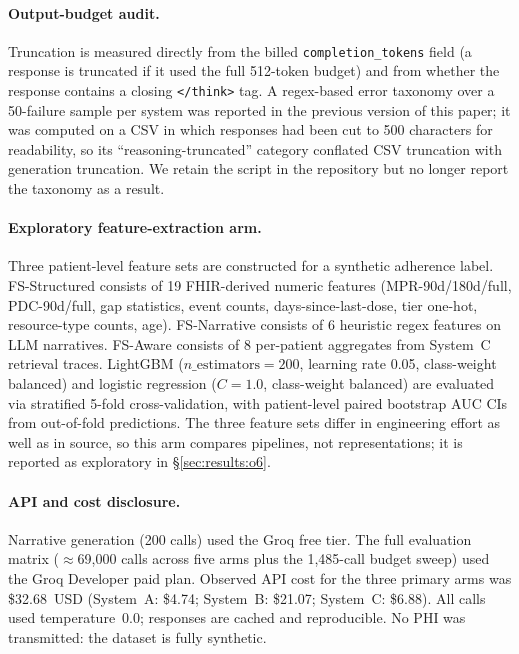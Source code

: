 \paragraph{Output-budget audit.}
Truncation is measured directly from the billed \texttt{completion\_tokens} field
(a response is truncated if it used the full 512-token budget) and from whether the
response contains a closing \texttt{</think>} tag.  A regex-based error taxonomy over a
50-failure sample per system was reported in the previous version of this paper; it was
computed on a CSV in which responses had been cut to 500 characters for readability, so
its ``reasoning-truncated'' category conflated CSV truncation with generation truncation.
We retain the script in the repository but no longer report the taxonomy as a result.

\paragraph{Exploratory feature-extraction arm.}
Three patient-level feature sets are constructed for a synthetic adherence label.
FS-Structured consists of 19 FHIR-derived numeric features (MPR-90d/180d/full,
PDC-90d/full, gap statistics, event counts, days-since-last-dose, tier one-hot,
resource-type counts, age).  FS-Narrative consists of 6 heuristic regex features on LLM
narratives.  FS-Aware consists of 8 per-patient aggregates from System~C retrieval traces.
LightGBM ($n\_\text{estimators}=200$, learning rate 0.05, class-weight balanced) and
logistic regression ($C=1.0$, class-weight balanced) are evaluated via stratified 5-fold
cross-validation, with patient-level paired bootstrap AUC CIs from out-of-fold predictions.
The three feature sets differ in engineering effort as well as in source, so this arm
compares pipelines, not representations; it is reported as exploratory in
\S\ref{sec:results:o6}.

\paragraph{API and cost disclosure.}
Narrative generation (200 calls) used the Groq free tier.  The full evaluation matrix
($\approx$69{,}000 calls across five arms plus the 1,485-call budget sweep) used the Groq
Developer paid plan.  Observed API cost for the three primary arms was \$32.68~USD
(System~A: \$4.74; System~B: \$21.07; System~C: \$6.88).  All calls used
temperature~0.0; responses are cached and reproducible.  No PHI was transmitted: the
dataset is fully synthetic.
